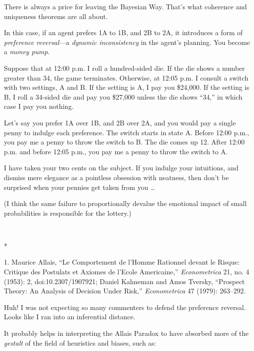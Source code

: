{
 There is always a price for leaving the Bayesian Way.
That's what coherence and uniqueness theorems are all
about.}

{
 In this case, if an agent prefers 1A to 1B, and 2B to 2A, it
introduces a form of \textit{preference reversal}{}---a \textit{dynamic
inconsistency} in the agent's planning. You become a
\textit{money pump}.}

{
 Suppose that at 12:00 p.m. I roll a hundred-sided die. If the die
shows a number greater than 34, the game terminates. Otherwise, at
12:05 p.m. I consult a switch with two settings, A and B. If the
setting is A, I pay you \$24,000. If the setting is B, I roll a
34-sided die and pay you \$27,000 unless the die shows
``34,'' in which case I pay you
nothing.}

{
 Let's say you prefer 1A over 1B, and 2B over 2A,
and you would pay a single penny to indulge each preference. The switch
starts in state A. Before 12:00 p.m., you pay me a penny to throw the
switch to B. The die comes up 12. After 12:00 p.m. and before 12:05
p.m., you pay me a penny to throw the switch to A.}

{
 I have taken your two cents on the subject. If you indulge your
intuitions, and dismiss mere elegance as a pointless obsession with
neatness, then don't be surprised when your pennies get
taken from you \ldots}

{
 (I think the same failure to proportionally devalue the emotional
impact of small probabilities is responsible for the lottery.)}

{\centering
 \ ~
\par}

{\centering
 *
\par}


\bigskip

{
 1. Maurice Allais, ``Le Comportement de
l'Homme Rationnel devant le Risque: Critique des
Postulats et Axiomes de l'Ecole
Americaine,'' \textit{Econometrica} 21, no. 4 (1953):
2, doi:10.2307/1907921; Daniel Kahneman and Amos Tversky,
``Prospect Theory: An Analysis of Decision Under
Risk,'' \textit{Econometrica} 47 (1979): 263--292.}


{
 Huh! I was not expecting so many commenters to defend the
preference reversal. Looks like I ran into an inferential distance. }

{
 It probably helps in interpreting the Allais Paradox to have
absorbed more of the \textit{gestalt} of the field of heuristics and
biases, such as:}

